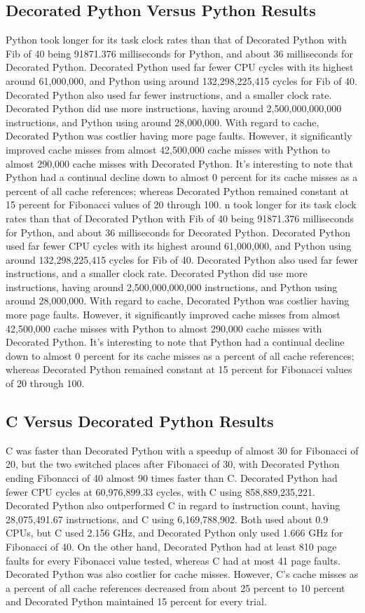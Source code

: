 \documentclass{sig-alternate}
\begin{document}
\subsection{Decorated Python Versus Python Results}
Python took longer for its task clock rates than that of Decorated Python with Fib of 40 being 91871.376 milliseconds for Python, and about 36 milliseconds for Decorated Python. Decorated Python used far fewer CPU cycles with its highest around 61,000,000, and Python using around 132,298,225,415 cycles for Fib of 40. Decorated Python also used far fewer instructions, and a smaller clock rate. Decorated Python did use more instructions, having around 2,500,000,000,000 instructions, and Python using around 28,000,000. With regard to cache, Decorated Python was costlier having more page faults. However, it significantly improved cache misses from almost 42,500,000 cache misses with Python to almost 290,000 cache misses with Decorated Python. It’s interesting to note that Python had a continual decline down to almost 0 percent for its cache misses as a percent of all cache references; whereas Decorated Python remained constant at 15 percent for Fibonacci values of 20 through 100. n took longer for its task clock rates than that of Decorated Python with Fib of 40 being 91871.376 milliseconds for Python, and about 36 milliseconds for Decorated Python. Decorated Python used far fewer CPU cycles with its highest around 61,000,000, and Python using around 132,298,225,415 cycles for Fib of 40. Decorated Python also used far fewer instructions, and a smaller clock rate. Decorated Python did use more instructions, having around 2,500,000,000,000 instructions, and Python using around 28,000,000. With regard to cache, Decorated Python was costlier having more page faults. However, it significantly improved cache misses from almost 42,500,000 cache misses with Python to almost 290,000 cache misses with Decorated Python. It’s interesting to note that Python had a continual decline down to almost 0 percent for its cache misses as a percent of all cache references; whereas Decorated Python remained constant at 15 percent for Fibonacci values of 20 through 100.

\subsection{C Versus Decorated Python Results}
C was faster than Decorated Python with a speedup of almost 30 for Fibonacci of 20, but the two switched places after Fibonacci of 30, with Decorated Python ending Fibonacci of 40 almost 90 times faster than C. Decorated Python had fewer CPU cycles at 60,976,899.33 cycles, with C using 858,889,235,221. Decorated Python also outperformed C in regard to instruction count, having 28,075,491.67 instructions, and C using 6,169,788,902. Both used about 0.9 CPUs, but C used 2.156 GHz, and Decorated Python only used 1.666 GHz for Fibonacci of 40. On the other hand, Decorated Python had at least 810 page faults for every Fibonacci value tested, whereas C had at most 41 page faults. Decorated Python was also costlier for cache misses. However, C’s cache misses as a percent of all cache references decreased from about 25 percent to 10 percent and Decorated Python maintained 15 percent for every trial.
\end{document}
